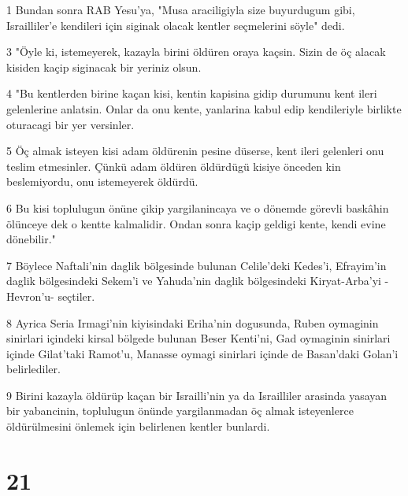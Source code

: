 \par 1 Bundan sonra RAB Yesu'ya, "Musa araciligiyla size buyurdugum gibi, Israilliler'e kendileri için siginak olacak kentler seçmelerini söyle" dedi.
\par 3 "Öyle ki, istemeyerek, kazayla birini öldüren oraya kaçsin. Sizin de öç alacak kisiden kaçip siginacak bir yeriniz olsun.
\par 4 "Bu kentlerden birine kaçan kisi, kentin kapisina gidip durumunu kent ileri gelenlerine anlatsin. Onlar da onu kente, yanlarina kabul edip kendileriyle birlikte oturacagi bir yer versinler.
\par 5 Öç almak isteyen kisi adam öldürenin pesine düserse, kent ileri gelenleri onu teslim etmesinler. Çünkü adam öldüren öldürdügü kisiye önceden kin beslemiyordu, onu istemeyerek öldürdü.
\par 6 Bu kisi toplulugun önüne çikip yargilanincaya ve o dönemde görevli baskâhin ölünceye dek o kentte kalmalidir. Ondan sonra kaçip geldigi kente, kendi evine dönebilir."
\par 7 Böylece Naftali'nin daglik bölgesinde bulunan Celile'deki Kedes'i, Efrayim'in daglik bölgesindeki Sekem'i ve Yahuda'nin daglik bölgesindeki Kiryat-Arba'yi -Hevron'u- seçtiler.
\par 8 Ayrica Seria Irmagi'nin kiyisindaki Eriha'nin dogusunda, Ruben oymaginin sinirlari içindeki kirsal bölgede bulunan Beser Kenti'ni, Gad oymaginin sinirlari içinde Gilat'taki Ramot'u, Manasse oymagi sinirlari içinde de Basan'daki Golan'i belirlediler.
\par 9 Birini kazayla öldürüp kaçan bir Israilli'nin ya da Israilliler arasinda yasayan bir yabancinin, toplulugun önünde yargilanmadan öç almak isteyenlerce öldürülmesini önlemek için belirlenen kentler bunlardi.

\chapter{21}

